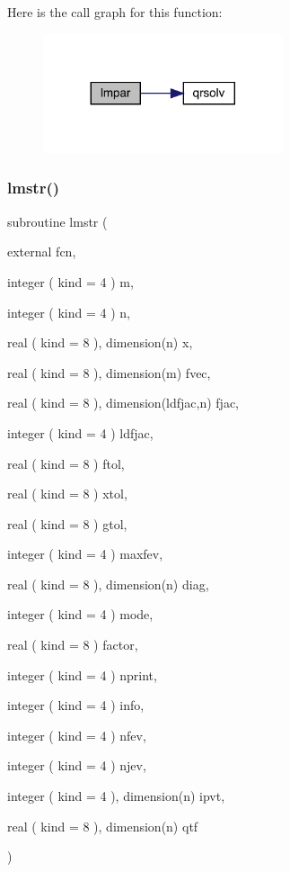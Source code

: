 Here is the call graph for this function\+:\nopagebreak
\begin{figure}[H]
\begin{center}
\leavevmode
\includegraphics[width=200pt]{minpack_8f95_a1dc1e9adda30350383f28f6cc6361365_cgraph}
\end{center}
\end{figure}
\mbox{\label{minpack_8f95_a178ff688f77b7192504790b6741ecd4d}} 
\subsubsection{\texorpdfstring{lmstr()}{lmstr()}}
{\footnotesize\ttfamily subroutine lmstr (\begin{DoxyParamCaption}\item[{external}]{fcn,  }\item[{integer ( kind = 4 )}]{m,  }\item[{integer ( kind = 4 )}]{n,  }\item[{real ( kind = 8 ), dimension(n)}]{x,  }\item[{real ( kind = 8 ), dimension(m)}]{fvec,  }\item[{real ( kind = 8 ), dimension(ldfjac,n)}]{fjac,  }\item[{integer ( kind = 4 )}]{ldfjac,  }\item[{real ( kind = 8 )}]{ftol,  }\item[{real ( kind = 8 )}]{xtol,  }\item[{real ( kind = 8 )}]{gtol,  }\item[{integer ( kind = 4 )}]{maxfev,  }\item[{real ( kind = 8 ), dimension(n)}]{diag,  }\item[{integer ( kind = 4 )}]{mode,  }\item[{real ( kind = 8 )}]{factor,  }\item[{integer ( kind = 4 )}]{nprint,  }\item[{integer ( kind = 4 )}]{info,  }\item[{integer ( kind = 4 )}]{nfev,  }\item[{integer ( kind = 4 )}]{njev,  }\item[{integer ( kind = 4 ), dimension(n)}]{ipvt,  }\item[{real ( kind = 8 ), dimension(n)}]{qtf }\end{DoxyParamCaption})}



